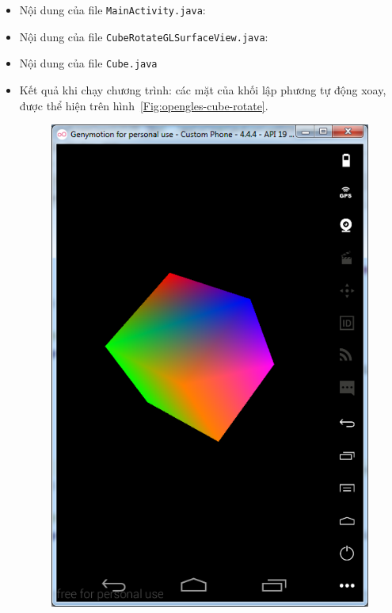 \documentclass[13pt,a4paper]{extreport}
\begin{document}
\begin{enumerate}[{\it a.}]
\begin{itemize}
						\item Nội dung của file \verb|MainActivity.java|:
							
		
						\item Nội dung của file \verb|CubeRotateGLSurfaceView.java|:
							
							
						\item Nội dung của file \verb|Cube.java|
							
					\end{itemize}
					
		\newpage			
		\begin{itemize}
			\item Kết quả khi chạy chương trình: các mặt của khối lập phương tự động xoay, được thể hiện trên hình~\ref{Fig:opengles-cube-rotate}.
				\begin{figure}[!h]
					\begin{center}
						\includegraphics[scale=.6]{images/opengles-cube-3.png}

\end{center}
\end{figure}
\end{itemize}
\end{enumerate}
\end{document}
